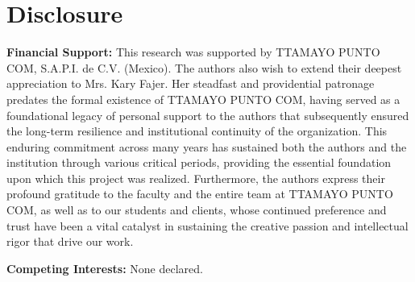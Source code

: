 \section*{Disclosure}\label{sec:disclosure}

\noindent \textbf{Financial Support:} This research was supported by TTAMAYO PUNTO COM, S.A.P.I. de C.V. (Mexico). The authors also wish to extend their deepest appreciation to Mrs. Kary Fajer. Her steadfast and providential patronage predates the formal existence of TTAMAYO PUNTO COM, having served as a foundational legacy of personal support to the authors that subsequently ensured the long-term resilience and institutional continuity of the organization. This enduring commitment across many years has sustained both the authors and the institution through various critical periods, providing the essential foundation upon which this project was realized. Furthermore, the authors express their profound gratitude to the faculty and the entire team at TTAMAYO PUNTO COM, as well as to our students and clients, whose continued preference and trust have been a vital catalyst in sustaining the creative passion and intellectual rigor that drive our work.

\noindent \textbf{Competing Interests:} None declared.

